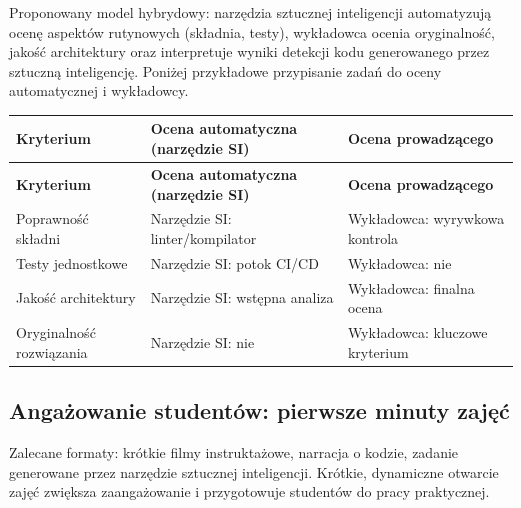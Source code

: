 \documentclass[12pt,a4paper]{article}
\newcommand{\thdrule}{\noalign{\global\setlength{\extrarowheight}{0pt}}}
\newcommand{\thdend}{\noalign{\global\setlength{\extrarowheight}{4pt}}}
\begin{document}
\noindent Proponowany model hybrydowy: narzędzia sztucznej inteligencji automatyzują ocenę aspektów rutynowych (składnia, testy), wykładowca ocenia oryginalność, jakość architektury oraz interpretuje wyniki detekcji kodu generowanego przez sztuczną inteligencję. Poniżej przykładowe przypisanie zadań do oceny automatycznej i wykładowcy.
\medskip
{\scriptsize
\begin{longtable}{m{4.5cm}m{5.5cm}m{4.5cm}}
\thdrule\toprule
\rowcolor{pjatkRed}
{\color{white}\footnotesize\textbf{\vphantom{Ag}Kryterium}} & {\color{white}\footnotesize\textbf{\vphantom{Ag}Ocena automatyczna (narzędzie SI)}} & {\color{white}\footnotesize\textbf{\vphantom{Ag}Ocena prowadzącego}} \\
\midrule\thdend
\endfirsthead
\thdrule\toprule
\rowcolor{pjatkRed}
{\color{white}\footnotesize\textbf{\vphantom{Ag}Kryterium}} & {\color{white}\footnotesize\textbf{\vphantom{Ag}Ocena automatyczna (narzędzie SI)}} & {\color{white}\footnotesize\textbf{\vphantom{Ag}Ocena prowadzącego}} \\
\midrule\thdend
\endhead
\rowcolor{tableRowLight} Poprawność składni & Narzędzie SI: linter/kompilator & Wykładowca: wyrywkowa kontrola \\
\rowcolor{tableRowAlt} Testy jednostkowe & Narzędzie SI: potok CI/CD & Wykładowca: nie \\
\rowcolor{tableRowLight} Jakość architektury & Narzędzie SI: wstępna analiza & Wykładowca: finalna ocena \\
\rowcolor{tableRowAlt} Oryginalność rozwiązania & Narzędzie SI: nie & Wykładowca: kluczowe kryterium \\
\bottomrule
\end{longtable}}
\medskip
\subsection*{Angażowanie studentów: pierwsze minuty zajęć}

\noindent Zalecane formaty: krótkie filmy instruktażowe, narracja o kodzie, zadanie generowane przez narzędzie sztucznej inteligencji. Krótkie, dynamiczne otwarcie zajęć zwiększa zaangażowanie i przygotowuje studentów do pracy praktycznej.
\medskip
\end{document}
